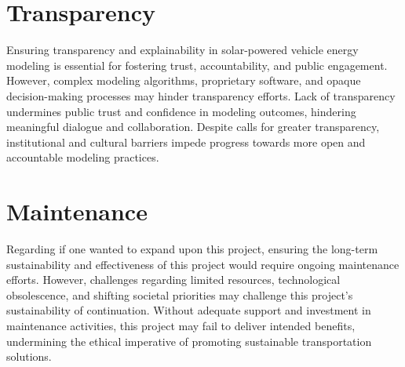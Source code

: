 \documentclass[10pt,twocolumn]{article}
\begin{document}
\section{Transparency}
Ensuring transparency and explainability in solar-powered vehicle energy modeling is essential for fostering trust, accountability, and public engagement. However, complex modeling algorithms, proprietary software, and opaque decision-making processes may hinder transparency efforts. Lack of transparency undermines public trust and confidence in modeling outcomes, hindering meaningful dialogue and collaboration. Despite calls for greater transparency, institutional and cultural barriers impede progress towards more open and accountable modeling practices.

\section{Maintenance}
Regarding if one wanted to expand upon this project, ensuring the long-term sustainability and effectiveness of this project would require ongoing maintenance efforts. However, challenges regarding limited resources, technological obsolescence, and shifting societal priorities may challenge this project's sustainability of continuation. Without adequate support and investment in maintenance activities, this project may fail to deliver intended benefits, undermining the ethical imperative of promoting sustainable transportation solutions.






\printbibliography
\end{document}
